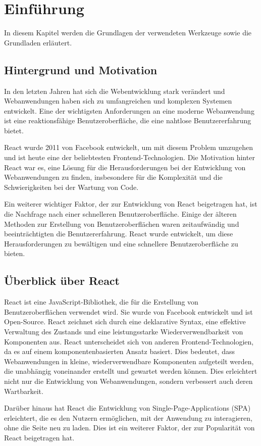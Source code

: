 \chapter{Einführung}
In diesem Kapitel werden die Grundlagen der verwendeten Werkzeuge sowie die Grundladen erläutert.

\section{Hintergrund und Motivation}
In den letzten Jahren hat sich die Webentwicklung stark verändert und Webanwendungen haben sich zu umfangreichen und komplexen Systemen entwickelt. Eine der wichtigsten Anforderungen an eine moderne Webanwendung ist eine reaktionsfähige Benutzeroberfläche, die eine nahtlose Benutzererfahrung bietet.

React wurde 2011 von Facebook entwickelt, um mit diesem Problem umzugehen und ist heute eine der beliebtesten Frontend-Technologien. Die Motivation hinter React war es, eine Lösung für die Herausforderungen bei der Entwicklung von Webanwendungen zu finden, insbesondere für die Komplexität und die Schwierigkeiten bei der Wartung von Code.

Ein weiterer wichtiger Faktor, der zur Entwicklung von React beigetragen hat, ist die Nachfrage nach einer schnelleren Benutzeroberfläche. Einige der älteren Methoden zur Erstellung von Benutzeroberflächen waren zeitaufwändig und beeinträchtigten die Benutzererfahrung. React wurde entwickelt, um diese Herausforderungen zu bewältigen und eine schnellere Benutzeroberfläche zu bieten.

\section{Überblick über React}
React ist eine JavaScript-Bibliothek, die für die Erstellung von Benutzeroberflächen verwendet wird. Sie wurde von Facebook entwickelt und ist Open-Source. React zeichnet sich durch eine deklarative Syntax, eine effektive Verwaltung des Zustands und eine leistungsstarke Wiederverwendbarkeit von Komponenten aus. React unterscheidet sich von anderen Frontend-Technologien, da es auf einem komponentenbasierten Ansatz basiert. Dies bedeutet, dass Webanwendungen in kleine, wiederverwendbare Komponenten aufgeteilt werden, die unabhängig voneinander erstellt und gewartet werden können. Dies erleichtert nicht nur die Entwicklung von Webanwendungen, sondern verbessert auch deren Wartbarkeit.

Darüber hinaus hat React die Entwicklung von Single-Page-Applications (SPA) erleichtert, die es den Nutzern ermöglichen, mit der Anwendung zu interagieren, ohne die Seite neu zu laden. Dies ist ein weiterer Faktor, der zur Popularität von React beigetragen hat.

